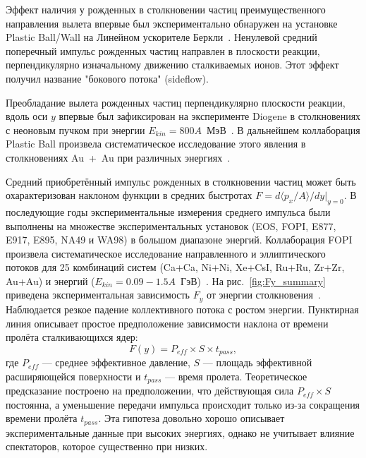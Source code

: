 Эффект наличия у рожденных в столкновении частиц преимущественного направления вылета впервые был экспериментально обнаружен на установке Plastic Ball/Wall на Линейном ускорителе Беркли~\cite{Gustafsson:1984ka}. 
Ненулевой средний поперечный импульс рожденных частиц направлен в плоскости реакции, перпендикулярно изначальному движению сталкиваемых ионов.
Этот эффект получил название "бокового потока" (sideflow).

Преобладание вылета рожденных частиц перпендикулярно плоскости реакции, вдоль оси $y$ впервые был зафиксирован на эксперименте Diogene в столкновениях с неоновым пучком при энергии $E_{kin}=800A$~МэВ~\cite{Demoulins:1990ac}.
В дальнейшем коллаборация Plastic Ball произвела систематическое исследование этого явления в столкновениях Au~+~Au при различных энергиях~\cite{Gustafsson:1984qh, Gutbrod:1988hh}.

Средний приобретённый импульс рожденных в столкновении частиц может быть охарактеризован наклоном функции в средних быстротах $F=d\langle p_x /A \rangle / dy|_{y=0}$.
В последующие годы экспериментальные измерения среднего импульса были выполнены на множестве экспериментальных установок (EOS, FOPI, E877, E917, E895, NA49 и WA98) в большом диапазоне энергий.
Коллаборация FOPI произвела систематическое исследование направленного и эллиптического потоков для 25 комбинаций систем (Ca+Ca, Ni+Ni, Xe+CsI, Ru+Ru, Zr+Zr, Au+Au) и энергий ($E_{kin}=0.09-1.5A$~ГэВ)~\cite{FOPI:2011aa}. 
На рис.~\ref{fig:Fy_summary} приведена экспериментальная зависимость $F_y$ от энергии столкновения~\cite{Herrmann:1999wu}.
Наблюдается резкое падение коллективного потока с ростом энергии.
Пунктирная линия описывает простое предположение зависимости наклона от времени пролёта сталкивающихся ядер:
%
\begin{equation}
    F(y) = P_{eff} \times S \times t_{pass},
\end{equation}
%
где $P_{eff}$ --- среднее эффективное давление, $S$ --- площадь эффективной расширяющейся поверхности и $t_{pass}$ --- время пролета.
Теоретическое предсказание построено на предположении, что действующая сила $P_{eff} \times S$ постоянна, а уменьшение передачи импульса происходит только из-за сокращения времени пролёта $t_{pass}$.
Эта гипотеза довольно хорошо описывает экспериментальные данные при высоких энергиях, однако не учитывает влияние спектаторов, которое существенно при низких.

